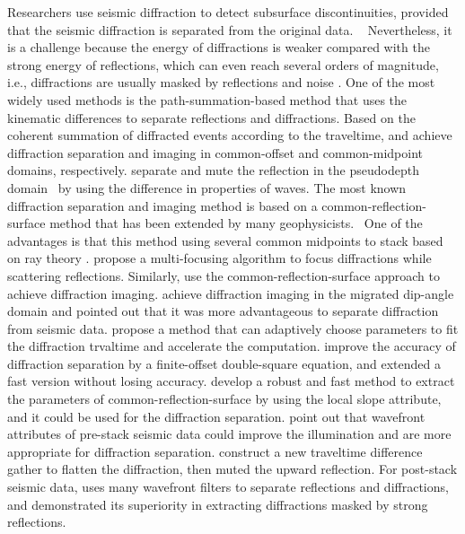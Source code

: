 Researchers use seismic diffraction to detect subsurface discontinuities, provided that the seismic diffraction is separated from the original data.  
Nevertheless, it is a challenge because the energy of diffractions is weaker compared with the strong energy of reflections, which can even reach several orders of magnitude, i.e., diffractions are usually masked by reflections and noise \cite[]{1994Theory, 2007Post,omar2020geo1}. 
One of the most widely used methods is the path-summation-based method that uses the kinematic differences to separate reflections and diffractions. Based on the coherent summation of diffracted events according to the traveltime, \cite[]{1987A} and \cite[]{1988Imaging} achieve diffraction separation and imaging in common-offset and common-midpoint domains, respectively. 
\cite[]{2004Diffraction} separate and mute the reflection in the pseudodepth domain  by using the difference in properties of waves.
The most known diffraction separation and imaging method is based on a common-reflection-surface method that has been extended by many geophysicists.
 One of the advantages is that this method using several common midpoints to stack based on ray theory \cite[]{2013Recovering}.
\cite[]{2009Diffraction} propose a multi-focusing algorithm to focus diffractions while scattering reflections.
Similarly, \cite[]{2011Common} use the common-reflection-surface approach to achieve diffraction imaging.
\cite[]{2012Separation} achieve diffraction imaging in the migrated dip-angle domain and pointed out that it was more advantageous to separate diffraction from seismic data. \cite[]{2013Diffraction} propose a method that can adaptively choose parameters to fit the diffraction trvaltime and accelerate the computation.
\cite[]{Coimbra2018Enhancement} improve the accuracy of diffraction separation by a finite-offset double-square equation, and extended a fast version without losing accuracy.
\cite[]{2018Fast} develop a robust and fast method to extract the parameters of common-reflection-surface by using the local slope attribute, and it could be used for the diffraction separation. 
\cite[]{2018Common} point out that wavefront attributes of pre-stack seismic data could improve the illumination and are more appropriate for diffraction separation.
\cite[]{20193D} construct a new traveltime difference gather to flatten the diffraction, then muted the upward reflection.
For post-stack seismic data, \cite[]{2019Coherent} uses many wavefront filters to separate reflections and diffractions, and demonstrated its superiority in extracting diffractions masked by strong reflections.


